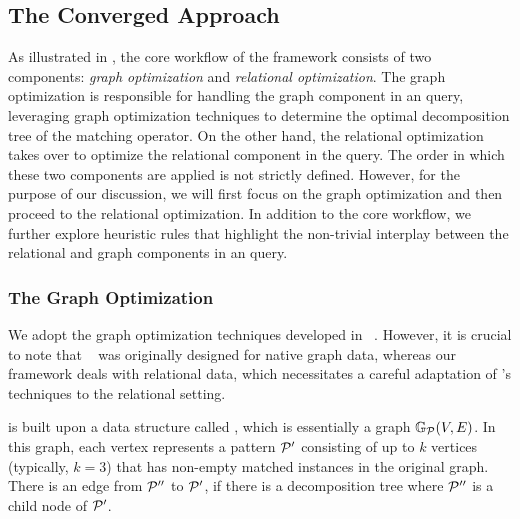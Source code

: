 \vspace*{-3mm}
\subsection{The Converged Approach}
\label{sec:converged}
As illustrated in , the core workflow of the \name framework consists of two components: \emph{graph optimization} and \emph{relational optimization}. The graph optimization is responsible for handling the graph component in an \spjm query, leveraging graph optimization techniques to determine the optimal decomposition tree of the matching operator. On the other hand, the relational optimization takes over to optimize the relational component in the query.
The order in which these two components are applied is not strictly defined. However, for the purpose of our discussion, we will first focus on the graph optimization and then proceed to the relational optimization.
In addition to the core workflow, we further explore heuristic rules that highlight the non-trivial interplay between the relational and graph components in an \spjm query.




\vspace*{-1mm}
\subsubsection{The Graph Optimization}
\label{sec:graph-optimizer}
We adopt the graph optimization techniques developed in \glogs~\cite{GLogS}. However, it is crucial to note that \glogs~ was originally designed for native graph data, whereas our framework deals with relational data, which necessitates a careful adaptation of \glogs's techniques to the relational setting.

 \glogs is built upon a data structure called \glogue, which is essentially a graph $\mathbb{G}_{\mathcal{P}}(V, E)$. In this graph, each vertex represents a pattern $\mathcal{P}'$ consisting of up to $k$ vertices (typically, $k=3$) that has non-empty matched instances in the original graph. There is an edge from $\mathcal{P}''$ to $\mathcal{P}'$, if there is a decomposition tree where $\mathcal{P}''$ is a child node of $\mathcal{P}'$.


